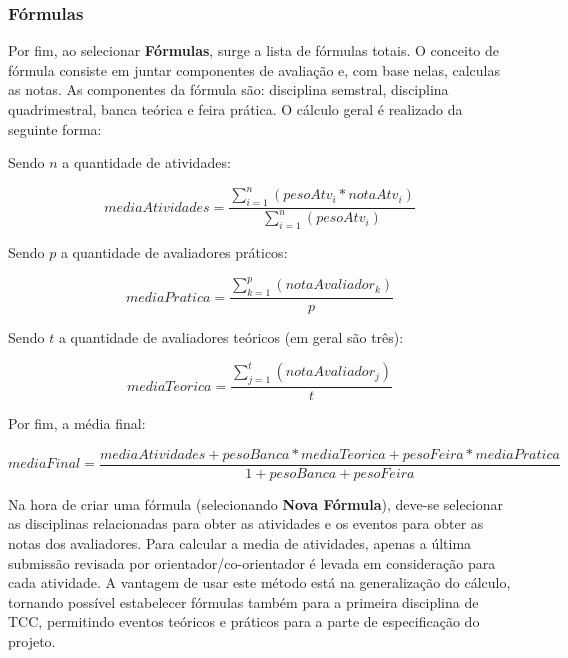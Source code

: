 \subsubsection{Fórmulas}
Por fim, ao selecionar \textbf{Fórmulas}, surge a lista de fórmulas totais. O conceito de fórmula consiste em juntar componentes de avaliação e, com base nelas, calculas as notas. As componentes da fórmula são: disciplina semstral, disciplina quadrimestral, banca teórica e feira prática. O cálculo geral é realizado da seguinte forma:

Sendo \begin{math}n\end{math} a quantidade de atividades:

\begin{equation}
    mediaAtividades = \frac{\sum_{i=1}^{n}(pesoAtv_{i}*notaAtv_{i})}{\sum_{i=1}^{n}(pesoAtv_{i})}
    \label{eq:activities}
\end{equation}

Sendo \begin{math}p\end{math} a quantidade de avaliadores práticos:

\begin{equation}
    mediaPratica = \frac{\sum_{k=1}^{p}(notaAvaliador_{k})}{p}
    \label{eq:practical}
\end{equation}

Sendo \begin{math}t\end{math} a quantidade de avaliadores teóricos (em geral são três):

\begin{equation}
    mediaTeorica = \frac{\sum_{j=1}^{t}(notaAvaliador_{j})}{t}
    \label{eq:theoretical}
\end{equation}

Por fim, a média final:

\begin{equation}
    mediaFinal = \frac{mediaAtividades + pesoBanca * mediaTeorica + pesoFeira * mediaPratica}{1 + pesoBanca + pesoFeira}
    \label{eq:final}
\end{equation}

Na hora de criar uma fórmula (selecionando \textbf{Nova Fórmula}), deve-se selecionar as disciplinas relacionadas para obter as atividades e os eventos para obter as notas dos avaliadores. Para calcular a media de atividades, apenas a última submissão revisada por orientador/co-orientador é levada em consideração para cada atividade. A vantagem de usar este método está na generalização do cálculo, tornando possível estabelecer fórmulas também para a primeira disciplina de TCC, permitindo eventos teóricos e práticos para a parte de especificação do projeto.

